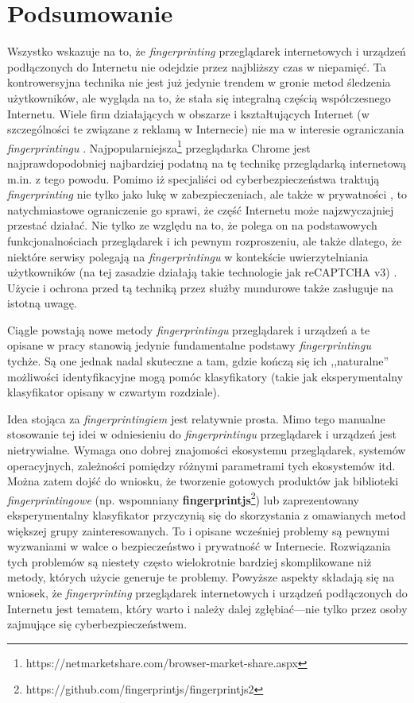 \chapter{Podsumowanie}
Wszystko wskazuje na to, że \emph{fingerprinting} przeglądarek internetowych i
urządzeń podłączonych do Internetu nie odejdzie przez najbliższy czas w
niepamięć. Ta kontrowersyjna technika nie jest już jedynie trendem w gronie
metod śledzenia użytkowników, ale wygląda na to, że stała się integralną częścią
współczesnego Internetu. Wiele firm działających w obszarze i kształtujących
Internet (w szczególności te związane z reklamą w Internecie) nie ma w interesie
ograniczania \emph{fingerprintingu} \cite{al2018beyond}.
Najpopularniejsza\footnote{https://netmarketshare.com/browser-market-share.aspx}
przeglądarka Chrome jest najprawdopodobniej najbardziej podatną \cite{al2017not}
na tę technikę przeglądarką internetową m.in. z tego powodu. Pomimo iż
specjaliści od cyberbezpieczeństwa traktują \emph{fingerprinting} nie tylko jako
lukę w zabezpieczeniach, ale także w prywatności
\cite{mowery2012pixel,al2020too}, to natychmiastowe ograniczenie go sprawi, że
część Internetu może najzwyczajniej przestać działać. Nie tylko ze względu na
to, że polega on na podstawowych funkcjonalnościach przeglądarek i ich pewnym
rozproszeniu, ale także dlatego, że niektóre serwisy polegają na
\emph{fingerprintingu} w kontekście uwierzytelniania użytkowników (na tej
zasadzie działają takie technologie jak reCAPTCHA v3) \cite{45581}. Użycie i
ochrona przed tą techniką przez służby mundurowe także zasługuje na istotną
uwagę.

Ciągle powstają nowe metody \emph{fingerprintingu} przeglądarek i urządzeń a te
opisane w pracy stanowią jedynie fundamentalne podstawy \emph{fingerprintingu}
tychże. Są one jednak nadal skuteczne a tam, gdzie kończą się ich ,,naturalne''
możliwości identyfikacyjne mogą pomóc klasyfikatory (takie jak eksperymentalny
klasyfikator opisany w czwartym rozdziale).

Idea stojąca za \emph{fingerprintingiem} jest relatywnie prosta. Mimo tego
manualne stosowanie tej idei w odniesieniu do \emph{fingerprintingu}
przeglądarek i urządzeń jest nietrywialne. Wymaga ono dobrej znajomości
ekosystemu przeglądarek, systemów operacyjnych, zależności pomiędzy różnymi
parametrami tych ekosystemów itd. Można zatem dojść do wniosku, że tworzenie
gotowych produktów jak biblioteki \emph{fingerprintingowe} (np. wspomniany
\textbf{fingerprintjs}\footnote{https://github.com/fingerprintjs/fingerprintjs2})
lub zaprezentowany eksperymentalny klasyfikator przyczynią się do skorzystania z
omawianych metod większej grupy zainteresowanych. To i opisane wcześniej
problemy są pewnymi wyzwaniami w walce o bezpieczeństwo i prywatność w
Internecie. Rozwiązania tych problemów są niestety często wielokrotnie bardziej
skomplikowane niż metody, których użycie generuje te problemy. Powyższe aspekty
składają się na wniosek, że \emph{fingerprinting} przeglądarek internetowych i
urządzeń podłączonych do Internetu jest tematem, który warto i należy dalej
zgłębiać---nie tylko przez osoby zajmujące się cyberbezpieczeństwem.
